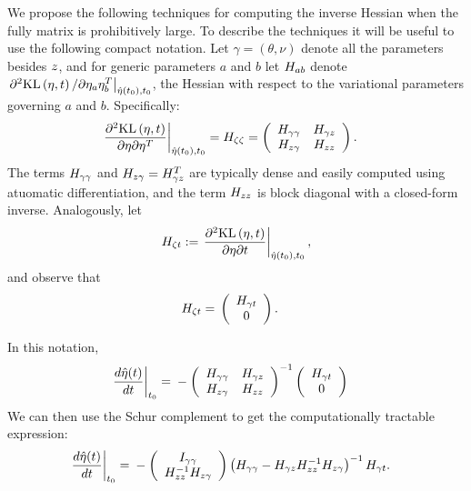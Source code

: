 We propose the following techniques for computing the inverse Hessian when the
fully matrix is prohibitively large.  To describe the techniques it will be
useful to use the following compact notation.  Let $\gamma = (\theta, \nu)$
denote all the parameters besides $z$, and for generic parameters $a$ and $b$
let $H_{ab}$ denote $\left.\partial^2 \mathrm{KL}\left(\eta, t\right) / \partial \eta_a
\eta_b^T\right|_{\hat\eta(t_0), t_0}$, the Hessian with respect to the variational
parameters governing $a$ and $b$.  Specifically:
%
\begin{align*}
%
\fracat{\partial^2 \KL{\eta, \t}}
       {\partial \eta \partial \eta^T}
       {\etaopt(\t_0), \t_0} ={}&
\hess{\zeta\zeta} =
\left(
\begin{array}{cc}
   \hess{\gamma\gamma} & \hess{\gamma\z} \\
   \hess{\z\gamma}     & \hess{\z\z} \\
\end{array}
\right).
%
\end{align*}
%
The terms $H_{\gamma\gamma}$ and $H_{z\gamma} = H_{\gamma z}^T$ are
typically dense and easily computed using atuomatic differentiation, and the
term $H_{zz}$ is block diagonal with a closed-form inverse.
%
Analogously, let
%
\begin{align*}
%
\hess{\zeta\t} :=
\fracat{\partial^2 \KL{\eta, \t}}
       {\partial \eta \partial \t}
       {\etaopt(\t_0), \t_0},
%
\end{align*}
%
and observe that
%
\begin{align*}
%
\hess{\zeta\t} ={}& \left( \begin{array}{c} \hess{\gamma\t} \\ 0 \end{array}\right).
%
\end{align*}

In this notation,
%
\begin{align*}
%
\fracat{d \etaopt(\t)}{d \t}{\t_0} ={}&
-\left(
\begin{array}{cc}
   \hess{\gamma\gamma} & \hess{\gamma\z} \\
   \hess{\z\gamma}     & \hess{\z\z} \\
\end{array}
\right)^{-1}
\left( \begin{array}{c} \hess{\gamma\t} \\ 0 \end{array}\right)
%
\end{align*}
%
We can then use the Schur complement to get the computationally tractable
expression:
%
\begin{align*}
%
\fracat{d \etaopt(\t)}{d \t}{\t_0} ={}&
-\left(\begin{array}{c}
I_{\gamma\gamma} \\
\hess{\z\z}^{-1} \hess{\z\gamma}
\end{array}\right)
\left(\hess{\gamma\gamma} -
      \hess{\gamma\z} \hess{\z\z}^{-1} \hess{\z\gamma}\right)^{-1} \hess{\gamma\t}.
%
\end{align*}

